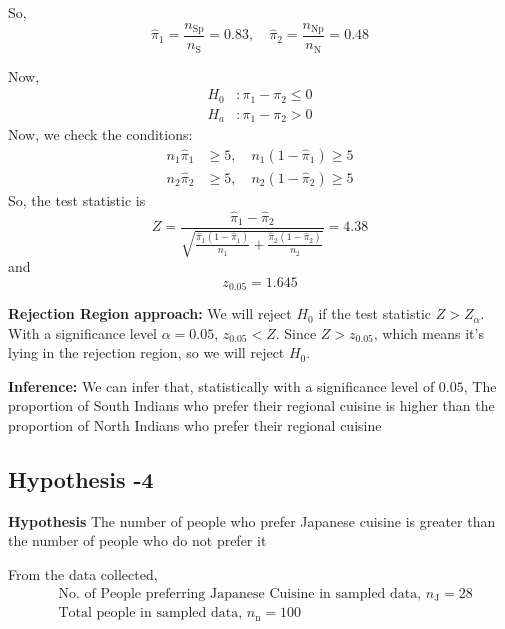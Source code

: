 \documentclass[12pt]{article}
\begin{document}
    So,
    \begin{equation}
        \hat{\pi}_1 = \frac{n_{\text{Sp}}}{n_{\text{S}}} = 0.83, \quad \hat{\pi}_2 = \frac{n_{\text{Np}}}{n_{\text{N}}} = 0.48
    \end{equation}

     Now,
    \begin{align}
        H_0 &: \pi_1 - \pi_2 \leq 0 \\
        H_a &: \pi_1 - \pi_2 > 0
    \end{align}
    Now, we check the conditions:
    \begin{align}
        n_1\hat{\pi}_1 &\geq 5, \quad n_1(1 - \hat{\pi}_1) \geq 5 \\
        n_2\hat{\pi}_2 &\geq 5, \quad n_2(1 - \hat{\pi}_2) \geq 5
    \end{align}
    So, the test statistic is
    \begin{equation}
        Z = \frac{\hat{\pi}_1 - \hat{\pi}_2}{\sqrt{\frac{\hat{\pi}_1(1-\hat{\pi}_1)}{n_1} + \frac{\hat{\pi}_2(1-\hat{\pi}_2)}{n_2}}} = 4.38
    \end{equation}
    and
    \begin{equation}
        z_{0.05} = 1.645
    \end{equation}

    \textbf{Rejection Region approach:}
We will reject $H_0$ if the test statistic $Z > Z_{\alpha}$.
With a significance level $\alpha = 0.05$, $z_{0.05} < Z$.
Since $Z > z_{0.05}$, which means it's lying in the rejection region, so we will reject $H_0$.
\medskip

\textbf{Inference:} We can infer that, statistically with a significance level of $0.05$,  The proportion of South Indians who prefer their regional cuisine is higher than the proportion of North Indians who prefer their regional cuisine

\newpage
    \subsection{Hypothesis -4}
    \textbf{Hypothesis}
        The number of people who prefer Japanese cuisine is greater than the number of people who do not prefer it
  
    From the data collected, 
    \begin{align}
        &\text{No. of People preferring Japanese Cuisine in sampled data, } n_{\text{J}} = 28 \\
        &\text{Total people in sampled data, } n_{\text{n}} = 100 \\
    \end{align}
    
\end{document}
